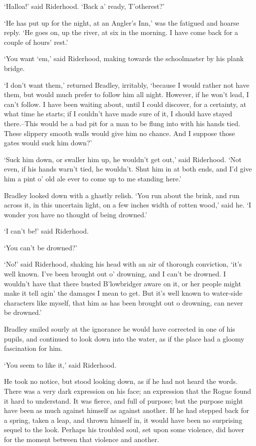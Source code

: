 ‘Halloa!’ said Riderhood. ‘Back a’ ready, T’otherest?’

‘He has put up for the night, at an Angler’s Inn,’ was the fatigued and
hoarse reply. ‘He goes on, up the river, at six in the morning. I have
come back for a couple of hours’ rest.’

‘You want ‘em,’ said Riderhood, making towards the schoolmaster by his
plank bridge.

‘I don’t want them,’ returned Bradley, irritably, ‘because I would
rather not have them, but would much prefer to follow him all night.
However, if he won’t lead, I can’t follow. I have been waiting about,
until I could discover, for a certainty, at what time he starts; if I
couldn’t have made sure of it, I should have stayed there.--This would
be a bad pit for a man to be flung into with his hands tied. These
slippery smooth walls would give him no chance. And I suppose those
gates would suck him down?’

‘Suck him down, or swaller him up, he wouldn’t get out,’ said Riderhood.
‘Not even, if his hands warn’t tied, he wouldn’t. Shut him in at both
ends, and I’d give him a pint o’ old ale ever to come up to me standing
here.’

Bradley looked down with a ghastly relish. ‘You run about the brink, and
run across it, in this uncertain light, on a few inches width of rotten
wood,’ said he. ‘I wonder you have no thought of being drowned.’

‘I can’t be!’ said Riderhood.

‘You can’t be drowned?’

‘No!’ said Riderhood, shaking his head with an air of thorough
conviction, ‘it’s well known. I’ve been brought out o’ drowning, and I
can’t be drowned. I wouldn’t have that there busted B’lowbridger aware
on it, or her people might make it tell agin’ the damages I mean to get.
But it’s well known to water-side characters like myself, that him as
has been brought out o drowning, can never be drowned.’

Bradley smiled sourly at the ignorance he would have corrected in one of
his pupils, and continued to look down into the water, as if the place
had a gloomy fascination for him.

‘You seem to like it,’ said Riderhood.

He took no notice, but stood looking down, as if he had not heard the
words. There was a very dark expression on his face; an expression
that the Rogue found it hard to understand. It was fierce, and full
of purpose; but the purpose might have been as much against himself as
against another. If he had stepped back for a spring, taken a leap, and
thrown himself in, it would have been no surprising sequel to the look.
Perhaps his troubled soul, set upon some violence, did hover for the
moment between that violence and another.

